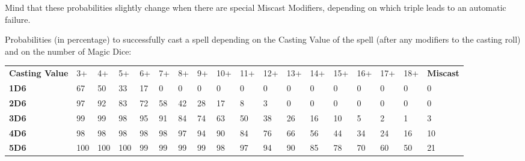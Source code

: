 \documentclass[a4paper,10pt]{article}
\begin{document}

Mind that these probabilities slightly change when there are special Miscast Modifiers, depending on which triple leads to an automatic failure.

Probabilities (in percentage) to successfully cast a spell depending on the Casting Value of the spell (after any modifiers to the casting roll) and on the number of Magic Dice:
{
\begin{center}
\setlength{\tabcolsep}{3pt}
\alternaterowcolors\begin{tabular}{M{3cm}*{16}{M{0.58cm}}M{1.5cm}}
\hline
\textbf{Casting Value} & 3+ & 4+ & 5+ & 6+ & 7+ & 8+ & 9+ & 10+ & 11+ & 12+ & 13+ & 14+ & 15+ & 16+ & 17+ & 18+ & \textbf{Miscast} \\
\textbf{1D6} & \num{67} & \num{50} & \num{33} & \num{17} & \num{0} & \num{0} & \num{0} & \num{0} & \num{0} & \num{0} & \num{0} & \num{0} & \num{0} & \num{0} & \num{0} & \num{0} & \num{0} \\
\textbf{2D6} & \num{97} & \num{92} & \num{83} & \num{72} & \num{58} & \num{42} & \num{28} & \num{17} & \num{8} & \num{3} & \num{0} & \num{0} & \num{0} & \num{0} & \num{0} & \num{0} & \num{0} \\
\textbf{3D6} & \num{99} & \num{99} & \num{98} & \num{95} & \num{91} & \num{84} & \num{74} & \num{63} & \num{50} & \num{38} & \num{26} & \num{16} & \num{10} & \num{5} & \num{2} & \num{1} & \num{3} \\
\textbf{4D6} & \num{98} & \num{98} & \num{98} & \num{98} & \num{98} & \num{97} & \num{94} & \num{90} & \num{84} & \num{76} & \num{66} & \num{56} & \num{44} & \num{34} & \num{24} & \num{16} & \num{10} \\
\textbf{5D6} & \num{100} & \num{100} & \num{100} & \num{99} & \num{99} & \num{99} & \num{99} & \num{98} & \num{97} & \num{94} & \num{90} & \num{85} & \num{78} & \num{70} & \num{60} & \num{50} & \num{21} \\
\hline
\end{tabular}
\end{center}
}
\end{document}
